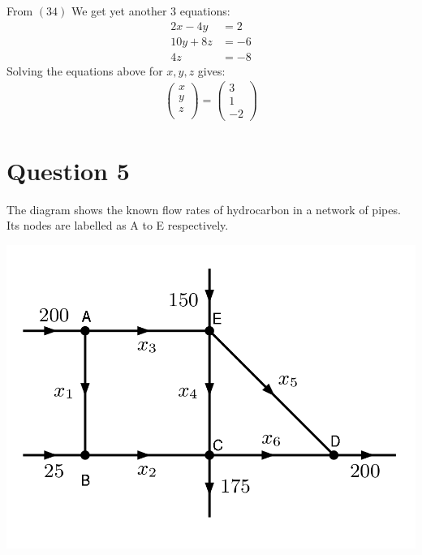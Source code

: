 \documentclass[12pt]{article}
\begin{document}
From $(34)$ We get yet another 3 equations:
\begin{align*}
2x-4y&=2\\
10y+8z&=-6\\
4z&=-8
\end{align*}
Solving the equations above  for $x,y,z$ gives:
\begin{align*}
\left(\begin{array}{c}
x\\
y\\
z\\
\end{array}\right)
=
\left(\begin{array}{c}
3\\
1\\
-2
\end{array}\right)
\end{align*}

\section{Question 5}
The diagram shows the known flow rates of hydrocarbon in a network of pipes.
Its nodes are labelled as A to E respectively.

\includegraphics[scale=0.4]{q5.png}
\newpage
\end{document}
